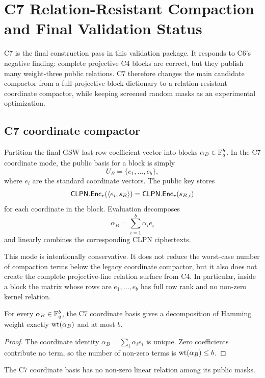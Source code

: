 \section{C7 Relation-Resistant Compaction and Final Validation Status}
\label{app:c7-relation-resistant}

C7 is the final construction pass in this validation package.  It responds to
C6's negative finding: complete projective C4 blocks are correct, but they
publish many weight-three public relations.  C7 therefore changes the main
candidate compactor from a full projective block dictionary to a
relation-resistant coordinate compactor, while keeping screened random masks as
an experimental optimization.

\subsection{C7 coordinate compactor}

Partition the final GSW last-row coefficient vector into blocks
$\alpha_B\in\mathbb{F}_q^b$.  In the C7 coordinate mode, the public basis for a block
is simply
\[
    U_B = \{e_1,\ldots,e_b\},
\]
where $e_i$ are the standard coordinate vectors.  The public key stores
\[
    \mathsf{CLPN}.\mathsf{Enc}_r(\langle e_i,s_B\rangle)
    =
    \mathsf{CLPN}.\mathsf{Enc}_r(s_{B,i})
\]
for each coordinate in the block.  Evaluation decomposes
\[
    \alpha_B=\sum_{i=1}^b \alpha_i e_i
\]
and linearly combines the corresponding CLPN ciphertexts.

This mode is intentionally conservative.  It does not reduce the worst-case
number of compaction terms below the legacy coordinate compactor, but it also
does not create the complete projective-line relation surface from C4.  In
particular, inside a block the matrix whose rows are $e_1,\ldots,e_b$ has full
row rank and no non-zero kernel relation.

\begin{lemma}
For every $\alpha_B\in\mathbb{F}_q^b$, the C7 coordinate basis gives a decomposition
of Hamming weight exactly $\operatorname{wt}(\alpha_B)$ and at most $b$.
\end{lemma}

\begin{proof}
The coordinate identity
$\alpha_B=\sum_i \alpha_i e_i$ is unique.  Zero coefficients contribute no
term, so the number of non-zero terms is $\operatorname{wt}(\alpha_B)\leq b$.
\end{proof}

\begin{lemma}
The C7 coordinate basis has no non-zero linear relation among its public masks.
\end{lemma}

